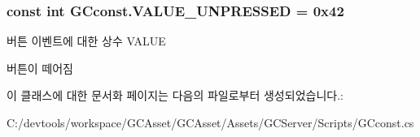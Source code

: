 \subsubsection[{V\+A\+L\+U\+E\+\_\+\+U\+N\+P\+R\+E\+S\+S\+E\+D}]{\setlength{\rightskip}{0pt plus 5cm}const int G\+Cconst.\+V\+A\+L\+U\+E\+\_\+\+U\+N\+P\+R\+E\+S\+S\+E\+D = 0x42}\label{class_g_cconst_ae71573553c10f6fa0dce4c8ef2a27e10}
버튼 이벤트에 대한 상수 V\+A\+L\+U\+E

버튼이 떼어짐 

이 클래스에 대한 문서화 페이지는 다음의 파일로부터 생성되었습니다.\+:\begin{DoxyCompactItemize}
\item 
C\+:/devtools/workspace/\+G\+C\+Asset/\+G\+C\+Asset/\+Assets/\+G\+C\+Server/\+Scripts/G\+Cconst.\+cs\end{DoxyCompactItemize}
